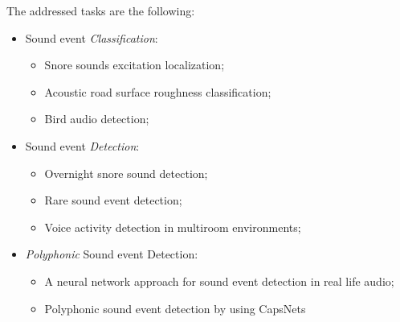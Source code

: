 The addressed tasks are the following:
\begin{itemize}
	\item Sound event \textit{Classification}:
	\begin{itemize}
		\item Snore sounds excitation localization;
		\item Acoustic road surface roughness classification;
		\item Bird audio detection;
	\end{itemize}
	\item Sound event \textit{Detection}:
	\begin{itemize}
		\item Overnight snore sound detection;
		\item Rare sound event detection;
		\item Voice activity detection in multiroom environments;
	\end{itemize}
	\item \textit{Polyphonic} Sound event Detection:
	\begin{itemize}
		\item A neural network approach for sound event detection in real life audio;
		\item Polyphonic sound event detection by using CapsNets		
	\end{itemize}
\end{itemize}




